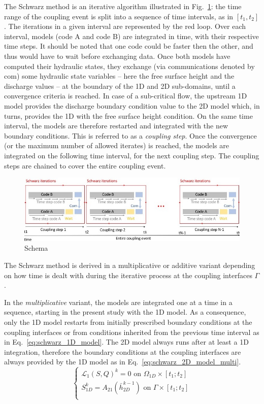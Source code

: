The Schwarz method is an iterative algorithm illustrated in
Fig.~\ref{fig:schemacoupling_time1}: the time range of the coupling
event is split into a sequence of time intervals, as in $[t_1, t_2]$. The
iterations in a given interval are represented by the red loop.
Over each interval,
models (code A and code B) are integrated in time, with their
respective time steps. It should be noted that one code could be
faster then the other, and thus would have to wait before exchanging
data. Once both models have computed their hydraulic states, they
exchange (via communications denoted by com) some hydraulic state
variables
-- here the free surface
height and the discharge values --
at the boundary of the 1D and 2D sub-domains, until a convergence criteria is
reached. In case of a sub-critical flow, the upstream 1D model
provides the discharge boundary condition value to the 2D model which,
in turns, provides the 1D with the free surface height condition. On
the same time interval, the models are therefore restarted and
integrated with the new boundary conditions. This is referred to as a
{\em coupling step}. Once the convergence (or the maximum number of allowed
iterates) is reached, the models are integrated on the following time
interval, for the next coupling step. The coupling steps are chained
to cover the entire coupling event.
\begin{figure}[htbp]
    \centering
    \includegraphics[width=12cm]{graphics/schemacoupling_time1.jpeg}
    \caption{Schema}\label{fig:schemacoupling_time1}
\end{figure}

The Schwarz method is derived in a multiplicative or additive variant
depending on how time is dealt with during the iterative process at
the coupling interfaces $\Gamma$.

In the \emph{multiplicative} variant, the models are integrated one at a
time in a sequence, starting in the present study with the 1D
model. As a consequence, only the 1D model restarts from initially
prescribed boundary conditions at the coupling interfaces or from
conditions inherited from the previous time interval as in
Eq.~\ref{eq:schwarz_1D_model}. The 2D model
always runs after at least a 1D integration, therefore the boundary
conditions at the coupling interfaces are always provided by the 1D
model as in Eq.~\ref{eq:schwarz_2D_model_multi}.
\begin{equation}
\left\lbrace
\begin{array}{l}
\mathcal{L}_1 (S,Q)^k = 0 \textrm{ on } \Omega_{1D} \times [t_1;t_2] \\
S_{1D}^k = A_{21}(\bar{h}_{2D}^{k-1}) \textrm{ on } \Gamma \times [t_1;t_2] \\
\end{array}
\right.
\label{eq:schwarz_1D_model}
\end{equation}

